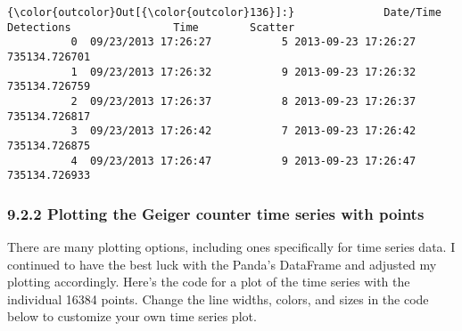 \documentclass{article}
\begin{document}
            \begin{Verbatim}[commandchars=\\\{\}]
{\color{outcolor}Out[{\color{outcolor}136}]:}              Date/Time  Detections                Time        Scatter
          0  09/23/2013 17:26:27           5 2013-09-23 17:26:27  735134.726701
          1  09/23/2013 17:26:32           9 2013-09-23 17:26:32  735134.726759
          2  09/23/2013 17:26:37           8 2013-09-23 17:26:37  735134.726817
          3  09/23/2013 17:26:42           7 2013-09-23 17:26:42  735134.726875
          4  09/23/2013 17:26:47           9 2013-09-23 17:26:47  735134.726933
\end{Verbatim}
        

    \subsubsection{9.2.2 Plotting the Geiger counter time series with points}


    There are many plotting options, including ones specifically for time
series data. I continued to have the best luck with the Panda's
DataFrame and adjusted my plotting accordingly. Here's the code for a
plot of the time series with the individual 16384 points. Change the
line widths, colors, and sizes in the code below to customize your own
time series plot.
\end{document}
